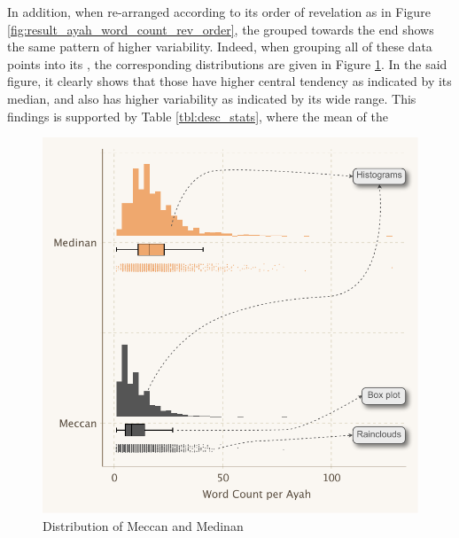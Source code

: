 In addition, when re-arranged according to its order of revelation as in Figure \ref{fig:result_ayah_word_count_rev_order}, the   grouped towards the end shows the same pattern of higher variability. Indeed, when grouping all of these data points into its  , the corresponding distributions are given in Figure \ref{fig:result_meccan_medinan_dist}. In the said figure, it clearly shows that those     have higher central tendency as indicated by its median, and also has higher variability as indicated by its wide range. This findings is supported by Table \ref{tbl:desc_stats}, where the mean of the 

\begin{figure}[!t]
    \centering
    \includegraphics[width=\textwidth]{img/plot3.pdf}
    \caption{Distribution of Meccan and Medinan  }
    \label{fig:result_meccan_medinan_dist}
\end{figure}


